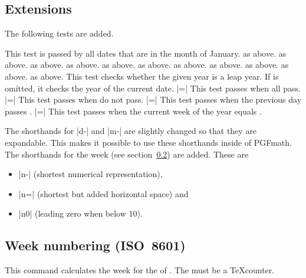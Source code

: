 \begin{multicols}{2}

\subsection{Extensions}

The following tests are added.
\begin{itemize}
 This test is passed by all dates that are in the month of January.
 as above.
 as above.
 as above.
 as above.
 as above.
 as above.
 as above.
 as above.
 as above.
 as above.
 as above.
    This test checks whether the given year is a leap year. If
     is omitted, it checks the year of the current date.
|=|
    This test passes when all  pass.
|=|
    This test passes when  do not pass.
|=|
    This test passes when the previous day passes .
|=|
    This test passes when the current week of the year equals .
\end{itemize}

The shorthands for |d-| and |m-| are slightly changed so that they are
expandable. This makes it possible to use these shorthands inside of PGFmath.
The shorthands for the week (see section~\ref{calendar:weeknumbering})
are added. These are
\begin{itemize}
\item |n-| (shortest numerical representation),
\item |n=| (shortest but added horizontal space) and
\item |n0| (leading zero when below 10).
\end{itemize}

\subsection{Week numbering (ISO~8601)}
\label{calendar:weeknumbering}
\begin{command}{\pgfcalendarjulianyeartoweek{}}
  This command calculates the week for the  of .
  The  must be a \TeX\space counter.


\end{command}
\end{multicols}
